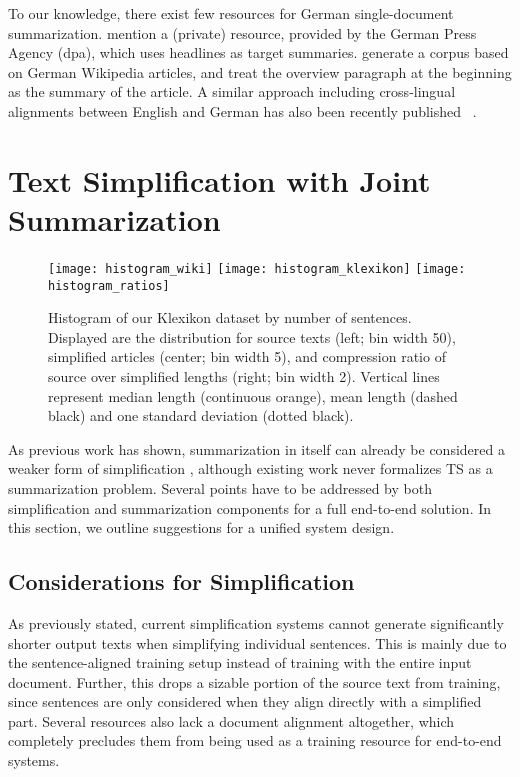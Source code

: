 \documentclass[10pt, a4paper]{article}
\begin{document}
To our knowledge, there exist few resources for German single-document summarization. \cite{nitsche2019abstractive} mention a (private) resource, provided by the German Press Agency (dpa), which uses headlines as target summaries. \cite{frefel-2020-summarization} generate a corpus based on German Wikipedia articles, and treat the overview paragraph at the beginning as the summary of the article. A similar approach including cross-lingual alignments between English and German has also been recently published \cite{fatima-strube-2021-novel}~.







\section{Text Simplification with Joint Summarization}

\begin{figure*}[ht]
	\centering
	\texttt{[image: histogram\_wiki]}
	\texttt{[image: histogram\_klexikon]}
	\texttt{[image: histogram\_ratios]}
	\caption{Histogram of our Klexikon dataset by number of sentences. Displayed are the distribution for source texts (left; bin width 50), simplified articles (center; bin width 5), and compression ratio of source over simplified lengths (right; bin width 2). Vertical lines represent median length (continuous orange), mean length (dashed black) and one standard deviation (dotted black).}
	\label{fig:stats}
\end{figure*}

As previous work has shown, summarization in itself can already be considered a weaker form of simplification \cite{margarido2008automatic,smith-jonsson-2011-automatic}, although existing work never formalizes TS as a summarization problem.
Several points have to be addressed by both simplification and summarization components for a full end-to-end solution. In this section, we outline suggestions for a unified system design.



\subsection{Considerations for Simplification}
As previously stated, current simplification systems cannot generate significantly shorter output texts when simplifying individual sentences. 
This is mainly due to the sentence-aligned training setup instead of training with the entire input document. 
Further, this drops a sizable portion of the source text from training, since sentences are only considered when they align directly with a simplified part.
Several resources also lack a document alignment altogether, which completely precludes them from being used as a training resource for end-to-end systems.
\end{document}
